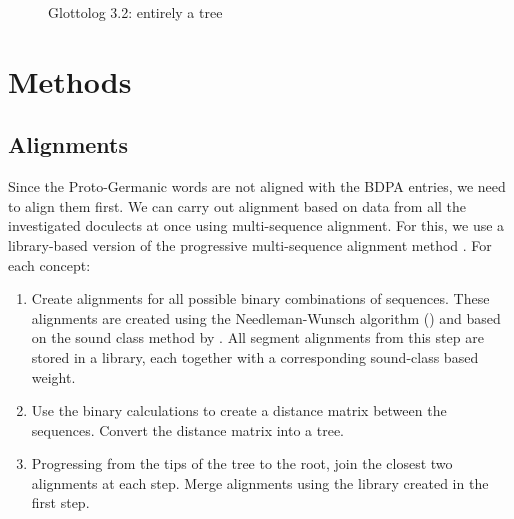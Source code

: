 \documentclass{article}
\begin{document}
\begin{figure}
\centering
{}
\caption{Glottolog 3.2: entirely a tree}
\label{fig:cwg_glottolog}
\end{figure}


\section{Methods}

\subsection{Alignments}

Since the Proto-Germanic words are not aligned with the BDPA entries, we need to align them first. 
We can carry out alignment based on data from all the investigated doculects at once using multi-sequence alignment.
For this, we use a library-based version \cite{notredame2000t-coffee:} of the progressive multi-sequence alignment method \cite{thompson1994clustal}.
For each concept:


\begin{enumerate}
\item
Create alignments for all possible binary combinations of sequences.
These alignments are created using the Needleman-Wunsch algorithm (\cite{needleman1970general}) and based on the sound class method by \cite{list2012sca:}.
All segment alignments from this step are stored in a library, each together with a corresponding sound-class based weight. %

\item
Use the binary calculations to create a distance matrix between the sequences.
Convert the distance matrix into a tree.

\item 
Progressing from the tips of the tree to the root, join the closest two alignments at each step.
Merge alignments using the library created in the first step.
\end{enumerate}
\end{document}
